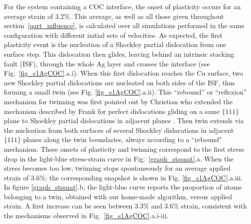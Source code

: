 \documentclass[final,3p,times,twocolumn]{elsarticle}
\begin{document}
For the system containing a COC interface, the onset of plasticity occurs for an average strain of 3.2\%. This average, as well as all those given throughout section~\ref{part_influence}, is calculated  over all simulations performed in the same configuration with different initial sets of velocities. As expected, the first plasticity event is the nucleation of a Shockley partial dislocation from one surface step. 
This dislocation then glides, leaving behind an intrinsic stacking fault (ISF), through the whole Ag layer and crosses the interface (see Fig.~\ref{fig_s1AgCOC}.a.i). When this first dislocation reaches the Cu surface, two new Shockley partial dislocations are nucleated on both sides of the ISF, thus forming a small twin (see Fig. \ref{fig_s1AgCOC}.a.ii). This ``rebound'' or ``reflexion'' mechanism for twinning was first pointed out by Christian who extended the mechanism described by Frank for perfect dislocations gliding on a same $\lbrace111\rbrace$ plane \cite{hirth82book} to Shockley partial dislocations in adjacent planes \cite{christian51PRS}. Then twin extends via the nucleation from both surfaces of several Shockley dislocations in adjacent $\lbrace111\rbrace$  planes along the twin boundaries, always according to a ``rebound" mechanism. These onsets of plasticity and twinning correspond to the first stress drop in the light-blue stress-strain curve in Fig.~\ref{graph_stssnat}.a. When the stress becomes too low, twinning stops spontaneously for an average applied strain of 3.6\%; the corresponding snapshot is shown in Fig. \ref{fig_s1AgCOC}.a.iii. In figure \ref{graph_stssnat}.b, the light-blue curve reports the proportion of atoms belonging to a twin, obtained with our home-made algorithm, versus applied strain. A first increase can be seen between 3.3\% and 3.6\% strain, consistent with the mechanisms observed in Fig.~\ref{fig_s1AgCOC}.a.i-iii. 
\end{document}
